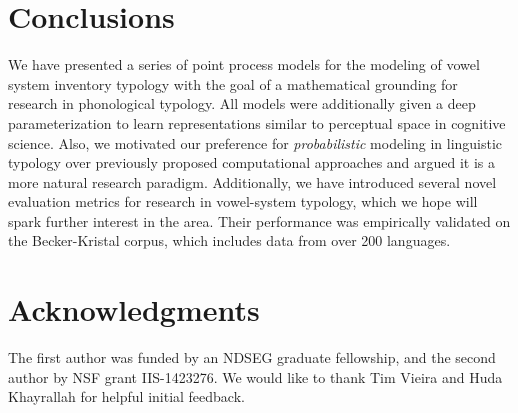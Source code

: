 \documentclass[11pt,a4paper]{article}
\begin{document}
\section{Conclusions}

We have presented a series of point process models for the modeling of
vowel system inventory typology with the goal of a mathematical
grounding for research in phonological typology. All models were
additionally given a deep parameterization to learn representations
similar to perceptual space in cognitive science.  Also, we motivated
our preference for {\em probabilistic} modeling in linguistic typology
over previously proposed computational approaches and argued it is a
more natural research paradigm. Additionally, we have introduced
several novel evaluation metrics for research in vowel-system
typology, which we hope will spark further interest in the area. Their
performance was empirically validated on the
Becker-Kristal corpus, which includes data from over 200
languages.

\section*{Acknowledgments}
The first author was funded by an NDSEG
graduate fellowship, and the second author by NSF grant IIS-1423276.
We would like to thank Tim Vieira and Huda Khayrallah for
helpful initial feedback.




\end{document}
